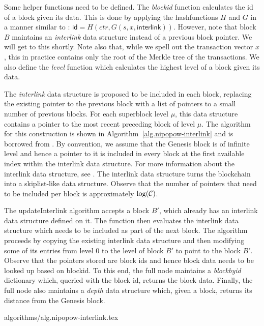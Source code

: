 Some helper functions need to be defined. The \textit{blockid} function
calculates the id of a block given its data. This is done by applying the
hashfunctions $H$ and $G$ in a manner similar to \cite{backbone}:
$\textsf{id} = H(ctr, G(s, x, \textsf{interlink}))$. However, note that block
$B$ maintains an \textit{interlink} data structure instead of a previous block
pointer. We will get to this shortly. Note also that, while we spell out the
transaction vector $x$, this in practice contains only the root of the Merkle
tree of the transactions. We also define the \textit{level} function which
calculates the highest level of a block given its data.

The \textit{interlink} data structure is proposed to be included in each block,
replacing the existing pointer to the previous block with a list of pointers to
a small number of previous blocks. For each superblock level $\mu$, this data
structure contains a pointer to the most recent preceding block of level
$\mu$. The algorithm for this construction is shown in
Algorithm~\ref{alg.nipopow-interlink} and is borrowed from \cite{KLS}. By
convention, we assume that the Genesis block is of infinite level and hence a
pointer to it is included in every block at the first available index within
the interlink data structure. For more information about the interlink data
structure, see \cite{KLS}. The interlink data structure turns the blockchain
into a skiplist-like data structure. Observe that the number of pointers that
need to be included per block is approximately $\log(\mathcal{C})$.

The updateInterlink algorithm accepts a block $B'$, which already has an
interlink data structure defined on it. The function then evaluates the
interlink data structure which needs to be included as part of the next block.
The algorithm proceeds by copying the existing interlink data structure and
then modifying some of its entries from level $0$ to the level of block $B'$ to
point to the block $B'$. Observe that the pointers stored are block ids and
hence block data needs to be looked up based on blockid. To this end, the full
node maintains a \textit{blockbyid} dictionary which, queried with the block
id, returns the block data. Finally, the full node also maintains a
\textit{depth} data structure which, given a block, returns its distance from
the Genesis block.

{algorithms/alg.nipopow-interlink.tex}
